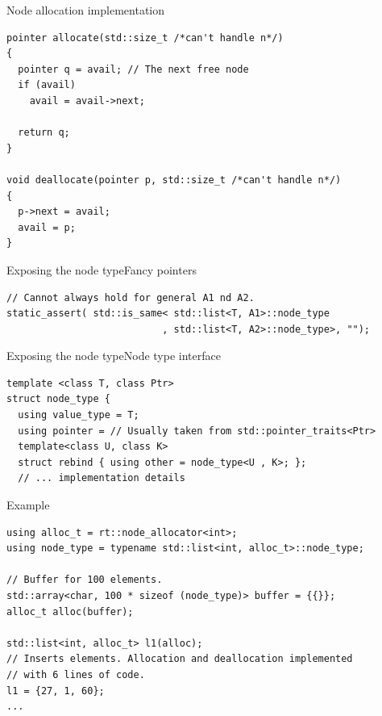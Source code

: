 \documentclass[10pt,aspectratio=169]{beamer}
\begin{document}
\begin{frame}[fragile]{Node allocation implementation}

\begin{lstlisting}
pointer allocate(std::size_t /*can't handle n*/)
{
  pointer q = avail; // The next free node
  if (avail)
    avail = avail->next;

  return q;
}

void deallocate(pointer p, std::size_t /*can't handle n*/)
{
  p->next = avail;
  avail = p;
}

\end{lstlisting}

\end{frame}

\begin{frame}[fragile]{Exposing the node type}{Fancy pointers}

\begin{lstlisting}
// Cannot always hold for general A1 nd A2.
static_assert( std::is_same< std::list<T, A1>::node_type
                           , std::list<T, A2>::node_type>, "");
\end{lstlisting}

\end{frame}

\begin{frame}[fragile]{Exposing the node type}{Node type interface}

\begin{lstlisting}
template <class T, class Ptr>
struct node_type {
  using value_type = T;
  using pointer = // Usually taken from std::pointer_traits<Ptr>
  template<class U, class K>
  struct rebind { using other = node_type<U , K>; };
  // ... implementation details
\end{lstlisting}

\end{frame}

\begin{frame}[fragile]{Example}

\begin{lstlisting}
using alloc_t = rt::node_allocator<int>;
using node_type = typename std::list<int, alloc_t>::node_type;

// Buffer for 100 elements.
std::array<char, 100 * sizeof (node_type)> buffer = {{}};
alloc_t alloc(buffer);

std::list<int, alloc_t> l1(alloc);
// Inserts elements. Allocation and deallocation implemented
// with 6 lines of code.
l1 = {27, 1, 60};
...
\end{lstlisting}

\end{frame}
\end{document}
